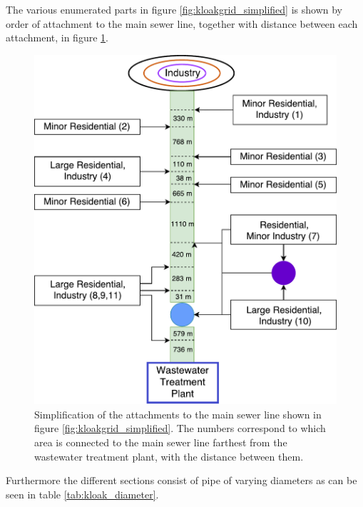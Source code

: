 The various enumerated parts in figure \ref{fig:kloakgrid_simplified} is shown by order of attachment to the main sewer line, together with distance between each attachment, in figure \ref{fig:sewer_line_diagram}. 

\begin{figure}[H]
\centering
\includegraphics[width=0.6 \textwidth]{report/system_overview/pictures/sewer_line_diagram.pdf}
\caption{Simplification of the attachments to the main sewer line shown in figure \ref{fig:kloakgrid_simplified}. The numbers correspond to which area is connected to the main sewer line farthest from the wastewater treatment plant, with the distance between them.}
\label{fig:sewer_line_diagram}
\end{figure}

Furthermore the different sections consist of pipe of varying diameters as can be seen in table \ref{tab:kloak_diameter}.

